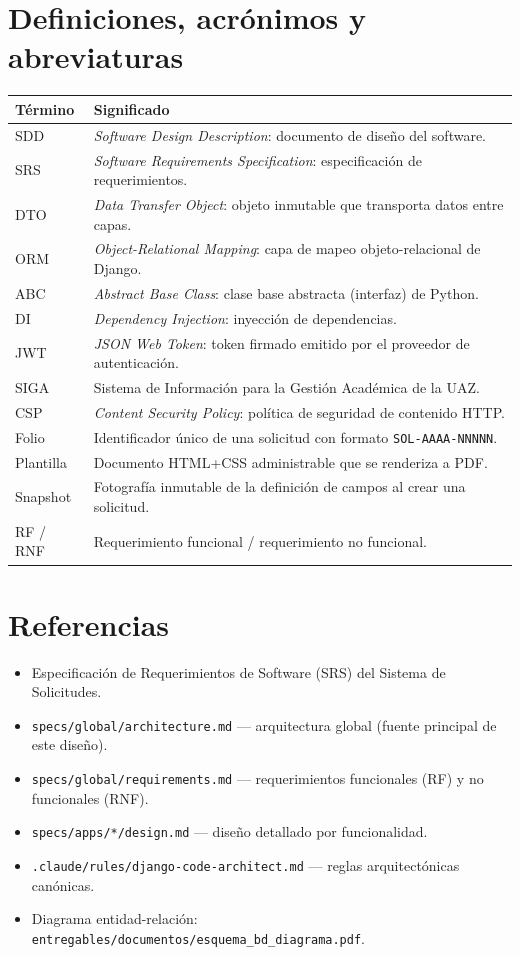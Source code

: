 \documentclass[12pt,letterpaper]{report}
\begin{document}
\section{Definiciones, acrónimos y abreviaturas}

\begin{longtable}{L{3.2cm} L{11cm}}
\toprule
\textbf{Término} & \textbf{Significado} \\
\midrule
\endhead
SDD & \textit{Software Design Description}: documento de diseño del software. \\
SRS & \textit{Software Requirements Specification}: especificación de requerimientos. \\
DTO & \textit{Data Transfer Object}: objeto inmutable que transporta datos entre capas. \\
ORM & \textit{Object-Relational Mapping}: capa de mapeo objeto-relacional de Django. \\
ABC & \textit{Abstract Base Class}: clase base abstracta (interfaz) de Python. \\
DI & \textit{Dependency Injection}: inyección de dependencias. \\
JWT & \textit{JSON Web Token}: token firmado emitido por el proveedor de autenticación. \\
SIGA & Sistema de Información para la Gestión Académica de la UAZ. \\
CSP & \textit{Content Security Policy}: política de seguridad de contenido HTTP. \\
Folio & Identificador único de una solicitud con formato \texttt{SOL-AAAA-NNNNN}. \\
Plantilla & Documento HTML+CSS administrable que se renderiza a PDF. \\
Snapshot & Fotografía inmutable de la definición de campos al crear una solicitud. \\
RF / RNF & Requerimiento funcional / requerimiento no funcional. \\
\bottomrule
\end{longtable}

\section{Referencias}

\begin{itemize}[leftmargin=1.4em]
  \item Especificación de Requerimientos de Software (SRS) del Sistema de Solicitudes.
  \item \texttt{specs/global/architecture.md} — arquitectura global (fuente principal de este diseño).
  \item \texttt{specs/global/requirements.md} — requerimientos funcionales (RF) y no funcionales (RNF).
  \item \texttt{specs/apps/*/design.md} — diseño detallado por funcionalidad.
  \item \texttt{.claude/rules/django-code-architect.md} — reglas arquitectónicas canónicas.
  \item Diagrama entidad-relación: \texttt{entregables/documentos/esquema\_bd\_diagrama.pdf}.
\end{itemize}
\end{document}
